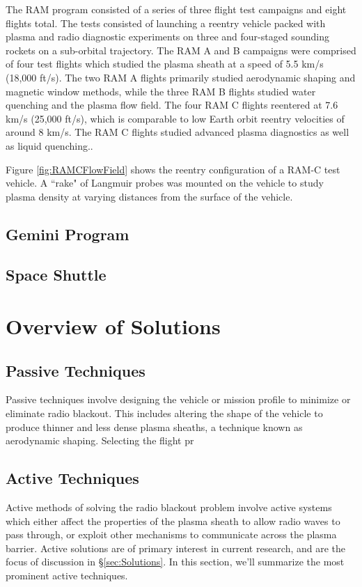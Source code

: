 \documentclass[twocolumn]{article}
\begin{document}
	The RAM program consisted of a series of three flight test campaigns and eight flights total.
	The tests consisted of launching a reentry vehicle packed with plasma and radio diagnostic experiments on three and four-staged sounding rockets on a sub-orbital trajectory.
	The RAM A and B campaigns were comprised of four test flights which studied the plasma sheath at a speed of 5.5 km/s (18,000 ft/s).\cite{huber_entry_1971}
	The two RAM A flights primarily studied aerodynamic shaping and magnetic window methods, while the three RAM B flights studied water quenching and the plasma flow field.
	The four RAM C flights reentered at 7.6 km/s (25,000 ft/s), which is comparable to low Earth orbit reentry velocities of around 8 km/s.
	The RAM C flights studied advanced plasma diagnostics as well as liquid quenching.\cite{huber_entry_1971}.
	
	Figure \ref{fig:RAMCFlowField} shows the reentry configuration of a RAM-C test vehicle.
	A ``rake" of Langmuir probes was mounted on the vehicle to study plasma density at varying distances from the surface of the vehicle.
	
	
	\subsection*{Gemini Program}
	
	\subsection*{Space Shuttle}



\section{Overview of Solutions} \label{sec:Overview}
	\subsection*{Passive Techniques}
		Passive techniques involve designing the vehicle or mission profile to minimize or eliminate radio blackout.
		This includes altering the shape of the vehicle to produce thinner and less dense plasma sheaths, a technique known as aerodynamic shaping.
		Selecting the flight pr
	\subsection*{Active Techniques}
		Active methods of solving the radio blackout problem involve active systems which either affect the properties of the plasma sheath to allow radio waves to pass through, or exploit other mechanisms to communicate across the plasma barrier.
		Active solutions are of primary interest in current research, and are the focus of discussion in \S\ref{sec:Solutions}.
		In this section, we'll summarize the most prominent active techniques.
	
\end{document}
